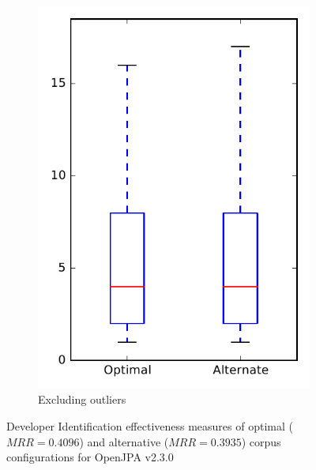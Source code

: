 \begin{figure}
\begin{subfigure}{.4\textwidth}
        \includegraphics[height=0.4\textheight]{figures/combo/dit_rq2_openjpa_no_outlier}
        \caption{Excluding outliers}\label{fig:combo:dit:rq2:openjpa_no_outlier}
    \end{subfigure}
\caption{Developer Identification effectiveness measures of optimal ($MRR=0.4096$) and alternative ($MRR=0.3935$) corpus configurations for OpenJPA v2.3.0}
\label{fig:combo:dit:rq2:openjpa}
\end{figure}
